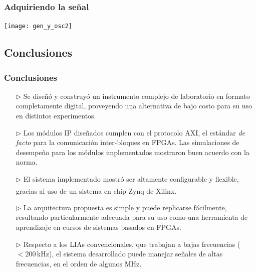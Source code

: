 \documentclass{beamer}
\begin{document}
\begin{frame}
\frametitle{Adquiriendo la señal}
\begin{center}
\texttt{[image: gen\_y\_osc2]}
\end{center}
\end{frame} 

\subsection{Conclusiones}
\begin{frame}
\frametitle{Conclusiones}
   \begin{itemize}
     \item[$\triangleright$] Se diseñó y construyó un instrumento complejo de
laboratorio en formato completamente digital, proveyendo una alternativa de bajo
costo para su uso en distintos experimentos.
     \item[$\triangleright$] Los módulos IP diseñados cumplen con el protocolo
AXI, el estándar \textit{de facto} para la comunicación inter-bloques en FPGAs.
Las simulaciones de desempeño para los módulos implementados mostraron buen
acuerdo con la norma.
     \item[$\triangleright$] El sistema implementado mostró ser altamente
configurable y flexible, gracias al uso de un sistema en chip
Zynq\textsuperscript{\textregistered} de Xilinx.
     \item[$\triangleright$] La arquitectura propuesta es simple y puede
replicarse fácilmente, resultando particularmente adecuada para su uso como una
herramienta de aprendizaje en cursos de sistemas basados en FPGAs.
     \item[$\triangleright$] Respecto a los LIAs convencionales, que trabajan a
bajas frecuencias ($ < 200\,$kHz), el sistema desarrollado puede
manejar señales de altas frecuencias, en el orden de algunos MHz.
   \end{itemize}
\end{frame} 
\end{document}
